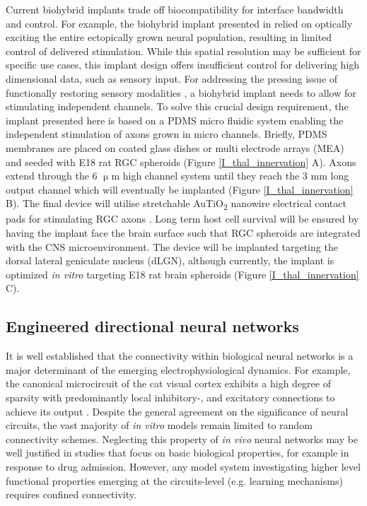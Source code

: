 Current biohybrid implants trade off biocompatibility for interface bandwidth
and control. For example, the biohybrid implant presented in \cite{cullenrecent}
relied on optically exciting the entire ectopically grown neural population,
resulting in limited control of delivered stimulation. While this spatial
resolution may be sufficient for specific use cases, this implant design offers
insufficient control for delivering high dimensional data, such as sensory
input. For addressing the pressing issue of functionally restoring sensory
modalities \parencite{blindnesssux}, a biohybrid implant needs to allow for
stimulating independent channels. To solve this crucial design requirement, the
implant presented here is based on a PDMS micro fluidic system enabling the
independent stimulation of axons grown in micro channels. Briefly, PDMS
membranes are placed on coated glass dishes or multi electrode arrays (MEA) and
seeded with E18 rat RGC spheroids (Figure \ref{I_thal_innervation} A). Axons
extend through the 6 $\upmu$m high channel system until they reach the 3 mm long
output channel which will eventually be implanted (Figure
\ref{I_thal_innervation} B). The final device will utilise stretchable
AuTiO\textsubscript{2} nanowire electrical contact pads for stimulating RGC
axons \parencite{nanowires}. Long term host cell survival will be ensured by
having the implant face the brain surface such that RGC spheroids are integrated
with the CNS microenvironment. The device will be implanted targeting the dorsal
lateral geniculate nucleus (dLGN), although currently, the implant is optimized
\textit{in vitro} targeting E18 rat brain spheroids (Figure
\ref{I_thal_innervation} C). 



\subsection{Engineered directional neural networks}
It is well established that the connectivity within biological neural networks
is a major determinant of the emerging electrophysiological dynamics. For
example, the canonical microcircuit of the cat visual cortex exhibits a high
degree of sparsity with predominantly local inhibitory-, and excitatory
connections to achieve its output \parencite{ctxcircuit}. Despite the general
agreement on the significance of neural circuits, the vast majority of
\textit{in vitro} models remain limited to random connectivity schemes.
Neglecting this property of \textit{in vivo} neural networks may be well
justified in studies that focus on basic biological properties, for example in
response to drug admission. However, any model system investigating higher level
functional properties emerging at the circuits-level (e.g. learning mechanisms)
requires confined connectivity. \\

